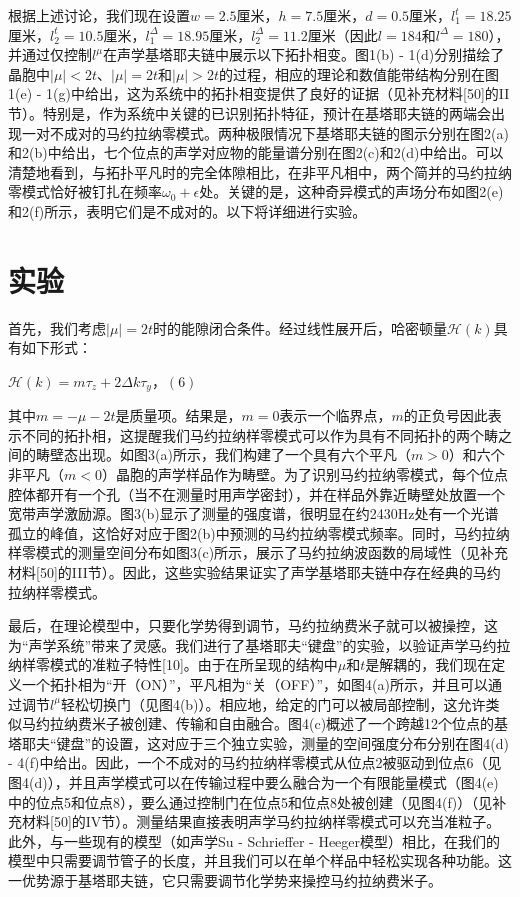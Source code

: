 根据上述讨论，我们现在设置\(w = 2.5\)厘米，\(h = 7.5\)厘米，\(d = 0.5\)厘米，\(l_{1}^{t} = 18.25\)厘米，\(l_{2}^{t} = 10.5\)厘米，\(l_{1}^{\Delta} = 18.95\)厘米，\(l_{2}^{\Delta} = 11.2\)厘米（因此\(l = 184\)和\(l^{\Delta} = 180\)），并通过仅控制\(l^{\mu}\)在声学基塔耶夫链中展示以下拓扑相变。图1(b) - 1(d)分别描绘了晶胞中\(\vert \mu \vert < 2t\)、\(\vert \mu \vert = 2t\)和\(\vert \mu \vert > 2t\)的过程，相应的理论和数值能带结构分别在图1(e) - 1(g)中给出，这为系统中的拓扑相变提供了良好的证据（见补充材料[50]的II节）。特别是，作为系统中关键的已识别拓扑特征，预计在基塔耶夫链的两端会出现一对不成对的马约拉纳零模式。两种极限情况下基塔耶夫链的图示分别在图2(a)和2(b)中给出，七个位点的声学对应物的能量谱分别在图2(c)和2(d)中给出。可以清楚地看到，与拓扑平凡时的完全体隙相比，在非平凡相中，两个简并的马约拉纳零模式恰好被钉扎在频率\(\omega_{0} + \epsilon\)处。关键的是，这种奇异模式的声场分布如图2(e)和2(f)所示，表明它们是不成对的。以下将详细进行实验。

\section{实验}

首先，我们考虑\(\vert \mu \vert = 2t\)时的能隙闭合条件。经过线性展开后，哈密顿量\(\mathcal{H}(k)\)具有如下形式：

\(\mathcal{H}(k) = m\tau_{z} + 2\Delta k\tau_{y}\)，\((6)\)

其中\(m = -\mu - 2t\)是质量项。结果是，\(m = 0\)表示一个临界点，\(m\)的正负号因此表示不同的拓扑相，这提醒我们马约拉纳样零模式可以作为具有不同拓扑的两个畴之间的畴壁态出现。如图3(a)所示，我们构建了一个具有六个平凡（\(m > 0\)）和六个非平凡（\(m < 0\)）晶胞的声学样品作为畴壁。为了识别马约拉纳零模式，每个位点腔体都开有一个孔（当不在测量时用声学密封），并在样品外靠近畴壁处放置一个宽带声学激励源。图3(b)显示了测量的强度谱，很明显在约2430Hz处有一个光谱孤立的峰值，这恰好对应于图2(b)中预测的马约拉纳零模式频率。同时，马约拉纳样零模式的测量空间分布如图3(c)所示，展示了马约拉纳波函数的局域性（见补充材料[50]的III节）。因此，这些实验结果证实了声学基塔耶夫链中存在经典的马约拉纳样零模式。

最后，在理论模型中，只要化学势得到调节，马约拉纳费米子就可以被操控，这为“声学系统”带来了灵感。我们进行了基塔耶夫“键盘”的实验，以验证声学马约拉纳样零模式的准粒子特性[10]。由于在所呈现的结构中\(\mu\)和\(t\)是解耦的，我们现在定义一个拓扑相为“开（ON）”，平凡相为“关（OFF）”，如图4(a)所示，并且可以通过调节\(l^{\mu}\)轻松切换门（见图4(b)）。相应地，给定的门可以被局部控制，这允许类似马约拉纳费米子被创建、传输和自由融合。图4(c)概述了一个跨越12个位点的基塔耶夫“键盘”的设置，这对应于三个独立实验，测量的空间强度分布分别在图4(d) - 4(f)中给出。因此，一个不成对的马约拉纳样零模式从位点2被驱动到位点6（见图4(d)），并且声学模式可以在传输过程中要么融合为一个有限能量模式（图4(e)中的位点5和位点8），要么通过控制门在位点5和位点8处被创建（见图4(f)）（见补充材料[50]的IV节）。测量结果直接表明声学马约拉纳样零模式可以充当准粒子。此外，与一些现有的模型（如声学Su - Schrieffer - Heeger模型）相比，在我们的模型中只需要调节管子的长度，并且我们可以在单个样品中轻松实现各种功能。这一优势源于基塔耶夫链，它只需要调节化学势来操控马约拉纳费米子。